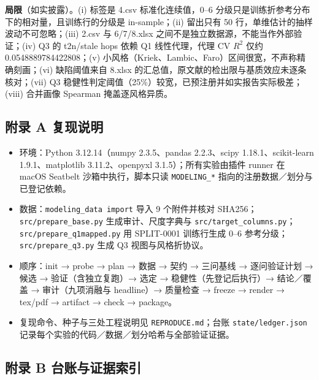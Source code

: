 \documentclass[
  11pt,
]{article}
\providecommand{\tightlist}{%
  \setlength{\itemsep}{0pt}\setlength{\parskip}{0pt}}
\begin{document}
\textbf{局限}（如实披露）。(i) 标签是 4.csv 标准化连续值，0--6
分级只是训练折参考分布下的相对量，且训练行的分级是 in-sample；(ii)
留出只有 50 行，单维估计的抽样波动不可忽略；(iii) 2.csv 与 6/7/8.xlsx
之间不是独立数据源，不能当作外部验证；(iv) Q3 的 t2n/stale hops 依赖 Q1
线性代理，代理 CV \(R^2\) 仅约 0.0548889784422808；(v)
小风格（Kriek、Lambic、Faro）区间很宽，不声称精确刻画；(vi) 缺陷阈值来自
8.xlsx 的汇总值，原文献的检出限与基质效应未逐条核对；(vii) Q3
稳健性判定阈值（25\%）较宽，已预注册并如实报告实际极差；(viii) 合并画像
Spearman 掩盖逐风格异质。

\subsection{附录 A
复现说明}\label{ux9644ux5f55-a-ux590dux73b0ux8bf4ux660e}

\begin{itemize}
\tightlist
\item
  环境：Python 3.12.14（numpy 2.3.5、pandas 2.2.3、scipy
  1.18.1、scikit-learn 1.9.1、matplotlib 3.11.2、openpyxl
  3.1.5）；所有实验由插件 runner 在 macOS Seatbelt 沙箱中执行，脚本只读
  \texttt{MODELING\_*} 指向的注册数据／划分与已登记依赖。
\item
  数据：\texttt{modeling\_data\ import} 导入 9 个附件并核对
  SHA256；\texttt{src/prepare\_base.py} 生成审计、尺度字典与
  \texttt{src/target\_columns.py}；\texttt{src/prepare\_q1mapped.py} 用
  SPLIT-0001 训练行生成 0--6 参考分级；\texttt{src/prepare\_q3.py} 生成
  Q3 视图与风格折协议。
\item
  顺序：init → probe → plan → 数据 → 契约 → 三问基线 → 逐问验证计划 →
  候选 → 验证（含独立复跑）→ 选定 → 稳健性（先登记后执行）→ 结论／覆盖 →
  审计（九项消融与 headline）→ 质量检查 → freeze → render → tex/pdf →
  artifact → check → package。
\item
  复现命令、种子与三处工程说明见 \texttt{REPRODUCE.md}；台账
  \texttt{state/ledger.json}
  记录每个实验的代码／数据／划分哈希与全部验证证据。
\end{itemize}

\subsection{附录 B
台账与证据索引}\label{ux9644ux5f55-b-ux53f0ux8d26ux4e0eux8bc1ux636eux7d22ux5f15}
\end{document}
